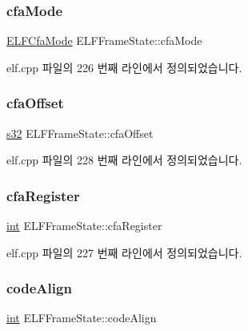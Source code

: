 \subsubsection{\texorpdfstring{cfa\+Mode}{cfaMode}}
{\footnotesize\ttfamily \mbox{\hyperlink{elf_8cpp_a59b5196163516898039d7f4d41a3f393}{E\+L\+F\+Cfa\+Mode}} E\+L\+F\+Frame\+State\+::cfa\+Mode}



elf.\+cpp 파일의 226 번째 라인에서 정의되었습니다.

\mbox{\label{struct_e_l_f_frame_state_a944cba546e5de720d2c88bf80c3e1691}} 
\subsubsection{\texorpdfstring{cfa\+Offset}{cfaOffset}}
{\footnotesize\ttfamily \mbox{\hyperlink{_system_8h_a0ce6887c26c1c49ad3be5710dd42bfd6}{s32}} E\+L\+F\+Frame\+State\+::cfa\+Offset}



elf.\+cpp 파일의 228 번째 라인에서 정의되었습니다.

\mbox{\label{struct_e_l_f_frame_state_ab70d9959aa4b747f95b792ce0823979c}} 
\subsubsection{\texorpdfstring{cfa\+Register}{cfaRegister}}
{\footnotesize\ttfamily \mbox{\hyperlink{_util_8cpp_a0ef32aa8672df19503a49fab2d0c8071}{int}} E\+L\+F\+Frame\+State\+::cfa\+Register}



elf.\+cpp 파일의 227 번째 라인에서 정의되었습니다.

\mbox{\label{struct_e_l_f_frame_state_ad5a26df4f99f4d5bdcfaea413e40b932}} 
\subsubsection{\texorpdfstring{code\+Align}{codeAlign}}
{\footnotesize\ttfamily \mbox{\hyperlink{_util_8cpp_a0ef32aa8672df19503a49fab2d0c8071}{int}} E\+L\+F\+Frame\+State\+::code\+Align}



